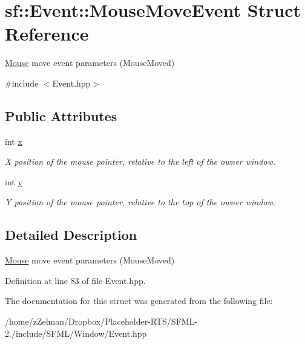 \hypertarget{structsf_1_1Event_1_1MouseMoveEvent}{\section{sf\-:\-:Event\-:\-:Mouse\-Move\-Event Struct Reference}
\label{structsf_1_1Event_1_1MouseMoveEvent}
}


\hyperlink{classsf_1_1Mouse}{Mouse} move event parameters (Mouse\-Moved)  




{\ttfamily \#include $<$Event.\-hpp$>$}

\subsection*{Public Attributes}
\begin{DoxyCompactItemize}
\item 
\hypertarget{structsf_1_1Event_1_1MouseMoveEvent_aa3a23809afb905cbb52c66d8512e21fd}{int \hyperlink{structsf_1_1Event_1_1MouseMoveEvent_aa3a23809afb905cbb52c66d8512e21fd}{x}}\label{structsf_1_1Event_1_1MouseMoveEvent_aa3a23809afb905cbb52c66d8512e21fd}

\begin{DoxyCompactList}\small\item\em X position of the mouse pointer, relative to the left of the owner window. \end{DoxyCompactList}\item 
\hypertarget{structsf_1_1Event_1_1MouseMoveEvent_a86d78a2fba5b3abda16ca059f2392ad4}{int \hyperlink{structsf_1_1Event_1_1MouseMoveEvent_a86d78a2fba5b3abda16ca059f2392ad4}{y}}\label{structsf_1_1Event_1_1MouseMoveEvent_a86d78a2fba5b3abda16ca059f2392ad4}

\begin{DoxyCompactList}\small\item\em Y position of the mouse pointer, relative to the top of the owner window. \end{DoxyCompactList}\end{DoxyCompactItemize}


\subsection{Detailed Description}
\hyperlink{classsf_1_1Mouse}{Mouse} move event parameters (Mouse\-Moved) 

Definition at line 83 of file Event.\-hpp.



The documentation for this struct was generated from the following file\-:\begin{DoxyCompactItemize}
\item 
/home/z\-Zelman/\-Dropbox/\-Placeholder-\/\-R\-T\-S/\-S\-F\-M\-L-\/2./include/\-S\-F\-M\-L/\-Window/Event.\-hpp\end{DoxyCompactItemize}
